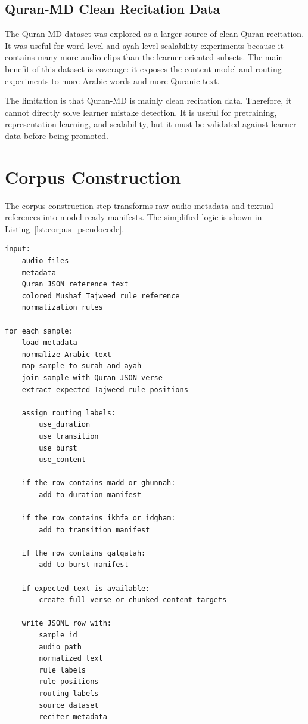 \subsection{Quran-MD Clean Recitation Data}

The Quran-MD dataset was explored as a larger source of clean Quran recitation.
It was useful for word-level and ayah-level scalability experiments because it
contains many more audio clips than the learner-oriented subsets. The main
benefit of this dataset is coverage: it exposes the content model and routing
experiments to more Arabic words and more Quranic text.

The limitation is that Quran-MD is mainly clean recitation data. Therefore, it
cannot directly solve learner mistake detection. It is useful for pretraining,
representation learning, and scalability, but it must be validated against
learner data before being promoted.

\section{Corpus Construction}

The corpus construction step transforms raw audio metadata and textual
references into model-ready manifests. The simplified logic is shown in
Listing~\ref{lst:corpus_pseudocode}.

\begin{lstlisting}[caption={Simplified pseudocode for corpus construction.},label={lst:corpus_pseudocode}]
input:
    audio files
    metadata
    Quran JSON reference text
    colored Mushaf Tajweed rule reference
    normalization rules

for each sample:
    load metadata
    normalize Arabic text
    map sample to surah and ayah
    join sample with Quran JSON verse
    extract expected Tajweed rule positions

    assign routing labels:
        use_duration
        use_transition
        use_burst
        use_content

    if the row contains madd or ghunnah:
        add to duration manifest

    if the row contains ikhfa or idgham:
        add to transition manifest

    if the row contains qalqalah:
        add to burst manifest

    if expected text is available:
        create full verse or chunked content targets

    write JSONL row with:
        sample id
        audio path
        normalized text
        rule labels
        rule positions
        routing labels
        source dataset
        reciter metadata
\end{lstlisting}

